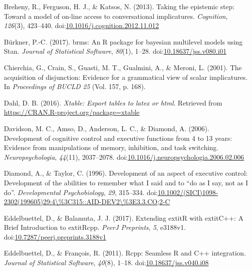 \documentclass[mask,man]{apa6}
\theoremstyle{definition}
\theoremstyle{definition}
\theoremstyle{definition}
\theoremstyle{remark}
\begin{document}
\hypertarget{ref-breheny2013}{}
Breheny, R., Ferguson, H. J., \& Katsos, N. (2013). Taking the epistemic
step: Toward a model of on-line access to conversational implicatures.
\emph{Cognition}, \emph{126}(3), 423--440.
doi:\href{https://doi.org/10.1016/j.cognition.2012.11.012}{10.1016/j.cognition.2012.11.012}

\hypertarget{ref-R-brms}{}
Bürkner, P.-C. (2017). brms: An R package for bayesian multilevel models
using Stan. \emph{Journal of Statistical Software}, \emph{80}(1), 1--28.
doi:\href{https://doi.org/10.18637/jss.v080.i01}{10.18637/jss.v080.i01}

\hypertarget{ref-chierchia2001}{}
Chierchia, G., Crain, S., Guasti, M. T., Gualmini, A., \& Meroni, L.
(2001). The acquisition of disjunction: Evidence for a grammatical view
of scalar implicatures. In \emph{Proceedings of BUCLD 25} (Vol. 157, p.
168).

\hypertarget{ref-R-xtable}{}
Dahl, D. B. (2016). \emph{Xtable: Export tables to latex or html}.
Retrieved from \url{https://CRAN.R-project.org/package=xtable}

\hypertarget{ref-davidson2006}{}
Davidson, M. C., Amso, D., Anderson, L. C., \& Diamond, A. (2006).
Development of cognitive control and executive functions from 4 to 13
years: Evidence from manipulations of memory, inhibition, and task
switching. \emph{Neuropsychologia}, \emph{44}(11), 2037--2078.
doi:\href{https://doi.org/10.1016/j.neuropsychologia.2006.02.006}{10.1016/j.neuropsychologia.2006.02.006}

\hypertarget{ref-diamond1996}{}
Diamond, A., \& Taylor, C. (1996). Development of an aspect of executive
control: Development of the abilities to remember what I said and to
``do as I say, not as I do''. \emph{Developmental Psychobiology},
\emph{29}, 315--334.
doi:\href{https://doi.org/10.1002/(SICI)1098-2302(199605)29:4/\%3C315::AID-DEV2/\%3E3.3.CO;2-C}{10.1002/(SICI)1098-2302(199605)29:4\textbackslash{}\%3C315::AID-DEV2\textbackslash{}\%3E3.3.CO;2-C}

\hypertarget{ref-R-Rcpp_b}{}
Eddelbuettel, D., \& Balamuta, J. J. (2017). Extending extitR with
extitC++: A Brief Introduction to extitRcpp. \emph{PeerJ Preprints},
\emph{5}, e3188v1.
doi:\href{https://doi.org/10.7287/peerj.preprints.3188v1}{10.7287/peerj.preprints.3188v1}

\hypertarget{ref-R-Rcpp_a}{}
Eddelbuettel, D., \& François, R. (2011). Rcpp: Seamless R and C++
integration. \emph{Journal of Statistical Software}, \emph{40}(8),
1--18.
doi:\href{https://doi.org/10.18637/jss.v040.i08}{10.18637/jss.v040.i08}
\end{document}
